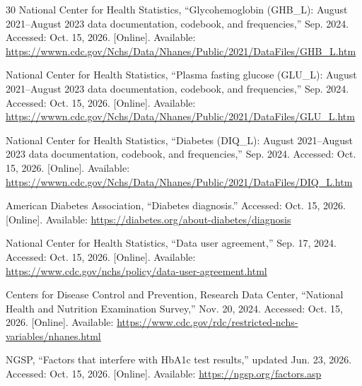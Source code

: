\documentclass[conference]{IEEEtran}
\begin{document}
\begin{thebibliography}{30}
National Center for Health Statistics, ``Glycohemoglobin (GHB\_L): August 2021--August 2023 data documentation, codebook, and frequencies,'' Sep. 2024. Accessed: Oct. 15, 2026. [Online]. Available: \url{https://wwwn.cdc.gov/Nchs/Data/Nhanes/Public/2021/DataFiles/GHB_L.htm}

National Center for Health Statistics, ``Plasma fasting glucose (GLU\_L): August 2021--August 2023 data documentation, codebook, and frequencies,'' Sep. 2024. Accessed: Oct. 15, 2026. [Online]. Available: \url{https://wwwn.cdc.gov/Nchs/Data/Nhanes/Public/2021/DataFiles/GLU_L.htm}

National Center for Health Statistics, ``Diabetes (DIQ\_L): August 2021--August 2023 data documentation, codebook, and frequencies,'' Sep. 2024. Accessed: Oct. 15, 2026. [Online]. Available: \url{https://wwwn.cdc.gov/Nchs/Data/Nhanes/Public/2021/DataFiles/DIQ_L.htm}

American Diabetes Association, ``Diabetes diagnosis.'' Accessed: Oct. 15, 2026. [Online]. Available: \url{https://diabetes.org/about-diabetes/diagnosis}

National Center for Health Statistics, ``Data user agreement,'' Sep. 17, 2024. Accessed: Oct. 15, 2026. [Online]. Available: \url{https://www.cdc.gov/nchs/policy/data-user-agreement.html}

Centers for Disease Control and Prevention, Research Data Center, ``National Health and Nutrition Examination Survey,'' Nov. 20, 2024. Accessed: Oct. 15, 2026. [Online]. Available: \url{https://www.cdc.gov/rdc/restricted-nchs-variables/nhanes.html}

NGSP, ``Factors that interfere with HbA1c test results,'' updated Jun. 23, 2026. Accessed: Oct. 15, 2026. [Online]. Available: \url{https://ngsp.org/factors.asp}

\end{thebibliography}
\end{document}
